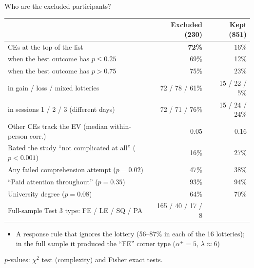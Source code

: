 \documentclass[aspectratio=169,11pt]{beamer}
\newcommand{\ap}{\alpha^{+}}
\newcommand{\tabnote}[1]{\par\vfill{\scriptsize\color{muted}#1\par}}
\newcommand{\tight}{\setlength{\itemsep}{3pt}}
\begin{document}
\begin{frame}{Who are the excluded participants?}
{\centering\footnotesize
\begin{tabular}{l rr}
\toprule
& Excluded (230) & Kept (851)\\
\midrule
CEs at the top of the list & \textbf{72\%} & 16\%\\
\quad when the best outcome has $p\le 0.25$ & 69\% & 12\%\\
\quad when the best outcome has $p>0.75$ & 75\% & 23\%\\
\quad in gain / loss / mixed lotteries & 72 / 78 / 61\% & 15 / 22 / 5\%\\
\quad in sessions 1 / 2 / 3 (different days) & 72 / 71 / 76\% & 15 / 24 / 24\%\\
Other CEs track the EV (median within-person corr.) & 0.05 & 0.16\\
\midrule
Rated the study ``not complicated at all'' ($p<0.001$) & 16\% & 27\%\\
Any failed comprehension attempt ($p=0.02$) & 47\% & 38\%\\
``Paid attention throughout'' ($p=0.35$) & 93\% & 94\%\\
University degree ($p=0.08$) & 64\% & 70\%\\
\midrule
Full-sample Test 3 type: FE / LE / SQ / PA & 165 / 40 / 17 / 8 & \\
\bottomrule
\end{tabular}\par}
\begin{itemize}\small\tight
  \item A response rule that ignores the lottery (56--87\% in each of the 16 lotteries); in the full sample it produced the ``FE'' corner type ($\ap=5$, $\lambda\approx 6$)
\end{itemize}
\tabnote{$p$-values: $\chi^2$ test (complexity) and Fisher exact tests.}
\end{frame}
\end{document}
